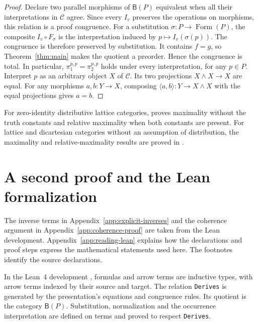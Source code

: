 \documentclass[11pt]{article}
\newcommand{\B}{\mathsf B}
\newcommand{\FormulaSet}{\operatorname{Form}}
\begin{document}
\begin{proof}
Declare two parallel morphisms of $\B(P)$ equivalent when all their
interpretations in $\mathcal C$ agree. Since every $I_v$ preserves
the operations on morphisms, this relation is a proof congruence. For a
substitution $\sigma:P\to\FormulaSet(P)$, the composite
$I_v\circ F_\sigma$ is the interpretation induced by
$p\mapsto I_v(\sigma(p))$. The congruence is therefore preserved
by substitution. It contains $f=g$, so
Theorem~\ref{thm:main} makes the quotient a preorder. Hence the
congruence is total. In particular,
$\pi_1^{p,p}=\pi_2^{p,p}$ holds under every interpretation, for any
$p\in P$. Interpret $p$ as an arbitrary object $X$ of $\mathcal C$.
Its two projections $X\wedge X\to X$ are equal. For any morphisms $a,b:Y\to X$, composing
$\langle a,b\rangle:Y\to X\wedge X$ with the equal projections gives $a=b$.
\end{proof}

For zero-identity distributive lattice categories,
\cite[\S12.5, p.~292]{DP} proves maximality without the truth
constants and relative maximality when both constants are present.
For lattice and dicartesian categories without an assumption of
distribution, the maximality and relative-maximality results are
proved in \cite[\S\S8--10]{DPBicartesian}.

\section{A second proof and the Lean formalization}\label{sec:formalization}

The inverse terms in Appendix~\ref{app:explicit-inverses} and the
coherence argument in Appendix~\ref{app:coherence-proof} are taken
from the Lean development. Appendix~\ref{app:reading-lean}
explains how the declarations and proof steps express the mathematical
statements used here. The footnotes identify the source declarations.

In the Lean~4 development \cite{Formalization}, formulas and arrow
terms are inductive types, with arrow terms indexed by their source
and target. The relation \texttt{Derives} is generated by the
presentation's equations and congruence rules. Its quotient is the
category $\B(P)$. Substitution, normalization and the occurrence
interpretation are defined on terms and proved to respect
\texttt{Derives}.
\end{document}
